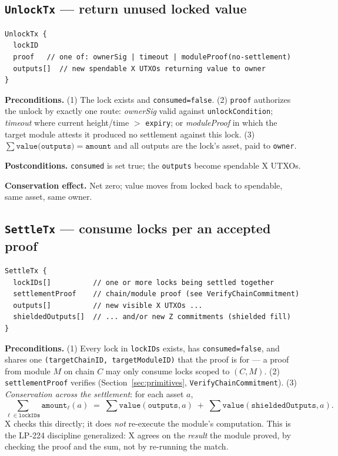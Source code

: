 \subsection{\texttt{UnlockTx} --- return unused locked value}

\begin{lstlisting}
UnlockTx {
  lockID
  proof   // one of: ownerSig | timeout | moduleProof(no-settlement)
  outputs[]  // new spendable X UTXOs returning value to owner
}
\end{lstlisting}

\textbf{Preconditions.} (1) The lock exists and \texttt{consumed=false}.
(2) \texttt{proof} authorizes the unlock by exactly one route:
\emph{ownerSig} valid against \texttt{unlockCondition};
\emph{timeout} where current height/time $>$ \texttt{expiry}; or
\emph{moduleProof} in which the target module attests it produced no
settlement against this lock. (3) $\sum\texttt{value(outputs)} =
\texttt{amount}$ and all outputs are the lock's asset, paid to
\texttt{owner}.

\textbf{Postconditions.} \texttt{consumed} is set true; the
\texttt{outputs} become spendable X UTXOs.

\textbf{Conservation effect.} Net zero; value moves from locked back to
spendable, same asset, same owner.

\subsection{\texttt{SettleTx} --- consume locks per an accepted proof}

\begin{lstlisting}
SettleTx {
  lockIDs[]          // one or more locks being settled together
  settlementProof    // chain/module proof (see VerifyChainCommitment)
  outputs[]          // new visible X UTXOs ...
  shieldedOutputs[]  // ... and/or new Z commitments (shielded fill)
}
\end{lstlisting}

\textbf{Preconditions.} (1) Every lock in \texttt{lockIDs} exists, has
\texttt{consumed=false}, and shares one \texttt{(targetChainID,
targetModuleID)} that the proof is for --- a proof from module $M$ on
chain $C$ may only consume locks scoped to $(C,M)$. (2)
\texttt{settlementProof} verifies (Section~\ref{sec:primitives},
\texttt{VerifyChainCommitment}). (3) \emph{Conservation across the
settlement}: for each asset $a$,
\[
  \sum_{\ell \in \texttt{lockIDs}} \texttt{amount}_\ell(a)
  \;=\;
  \sum \texttt{value}(\texttt{outputs}, a)
  \;+\;
  \sum \texttt{value}(\texttt{shieldedOutputs}, a).
\]
X checks this directly; it does \emph{not} re-execute the module's
computation. This is the LP-224 discipline generalized: X agrees on the
\emph{result} the module proved, by checking the proof and the sum, not
by re-running the match.

